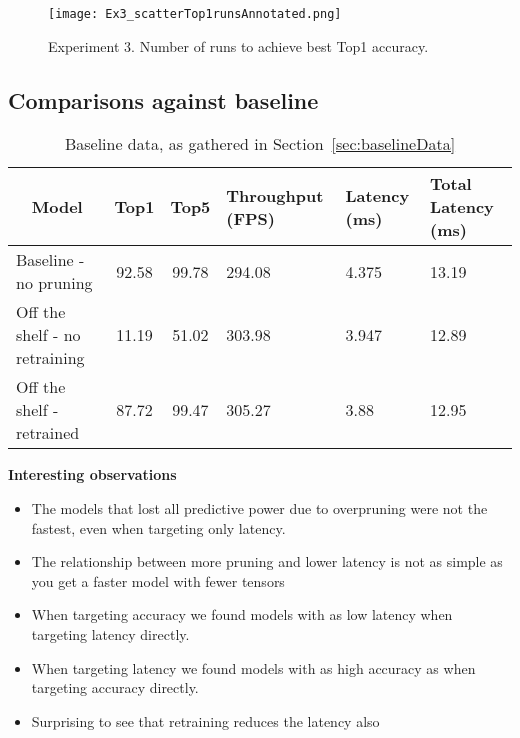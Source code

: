 \documentclass[../Dissertation.tex]{subfiles}
\begin{document}
\begin{figure}[H]
    \centering
    \texttt{[image: Ex3\_scatterTop1runsAnnotated.png]}
    \caption{Experiment 3. Number of runs to achieve best Top1 accuracy.}
    \label{fig:ex3Top1Rate}
\end{figure}

\subsection{Comparisons against baseline}

\begin{table}[H]
    \begin{tabular}{@{}lccp{25mm}p{23mm}p{28mm}@{}}
    \toprule
    \multicolumn{1}{c}{\textbf{Model}} & \textbf{Top1} & \textbf{Top5} & \textbf{Throughput (FPS)} & \textbf{Latency (ms)} & \textbf{Total Latency (ms)} \\ \midrule
    Baseline - no pruning              & 92.58         & 99.78         & 294.08                    & 4.375                 & 13.19                       \\
    Off the shelf - no retraining      & 11.19         & 51.02         & 303.98                    & 3.947                 & 12.89                       \\
    Off the shelf - retrained          &  87.72        & 99.47         & 305.27                    & 3.88                  & 12.95                           \\ \bottomrule
    \end{tabular}
    \caption{Baseline data, as gathered in Section~\ref{sec:baselineData}}
\end{table}




\textbf{Interesting observations}
\begin{itemize}
    \item The models that lost all predictive power due to overpruning were not the fastest, even when targeting only latency.
    \item The relationship between more pruning and lower latency is not as simple as you get a faster model with fewer tensors
    \item When targeting accuracy we found models with as low latency when targeting latency directly.
    \item When targeting latency we found models with as high accuracy as when targeting accuracy directly.
    \item Surprising to see that retraining reduces the latency also
\end{itemize}
\end{document}
